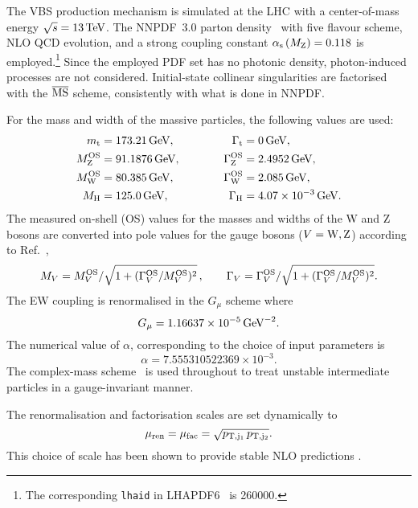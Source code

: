 The VBS production mechanism is simulated at the LHC with a center-of-mass energy $\sqrt s = 13 \,\text{TeV}$. 
The NNPDF~3.0 parton density~\cite{Ball:2014uwa} with five flavour scheme, NLO QCD evolution, and a strong coupling constant $\alpha_\text{s}\left( M_\text{Z} \right) = 0.118$ is employed.\footnote{The corresponding {\tt lhaid} in LHAPDF6~\cite{Buckley:2014ana} is 260000.} 
Since the employed PDF set has no photonic density, photon-induced processes are not considered.
Initial-state collinear singularities are factorised with the ${\overline{\rm MS}}$ scheme, consistently with what is done in NNPDF.

For the mass and width of the massive particles, the following values are used:
%
\begin{alignat}{2}
                  m_\text{t}   &=  173.21\,\text{GeV},       & \quad \quad \quad \Gamma_\text{t} &= 0 \,\text{GeV},  \nonumber \\
                M_\text{Z}^\text{OS} &=  91.1876\,\text{GeV},      & \quad \quad \quad \Gamma_\text{Z}^\text{OS} &= 2.4952\,\text{GeV},  \nonumber \\
                M_\text{W}^\text{OS} &=  80.385\,\text{GeV},       & \Gamma_\text{W}^\text{OS} &= 2.085\,\text{GeV},  \nonumber \\
                M_{\rm H} &=  125.0\,\text{GeV},       &  \Gamma_\text{H}   &=  4.07 \times 10^{-3}\,\text{GeV}.
\end{alignat}
%
The measured on-shell (OS) values for the masses and widths of the W and Z bosons are converted into pole values for the gauge bosons ($V=\text{W},\text{Z}$) according to Ref.~\cite{Bardin:1988xt},
%
\begin{equation}
        M_V = M_{V}^\text{OS}/\sqrt{1+(\Gamma_{V}^\text{OS}/M_{V}^\text{OS})^2}\,,\qquad  \Gamma_V = \Gamma_{V}^\text{OS}/\sqrt{1+(\Gamma_{V}^\text{OS}/M_{V}^\text{OS})^2}.
\end{equation}
%
The EW coupling is renormalised in the $G_\mu$ scheme \cite{Denner:2000bj} where
%
\begin{equation}
    G_{\mu}    = 1.16637\times 10^{-5}\,\text{GeV}^{-2}.
\end{equation}
%
The numerical value of $\alpha$, corresponding to the choice of input parameters is
%
\begin{equation}
 \alpha = 7.555310522369 \times 10^{-3}.
\end{equation}
%
The complex-mass scheme~\cite{Denner:1999gp,Denner:2005fg} is used throughout to treat unstable intermediate particles in a gauge-invariant manner.

The renormalisation and factorisation scales are set dynamically to
%
\begin{equation}
\label{eq:defscale}
 \mu_{\rm ren} = \mu_{\rm fac} = \sqrt{p_{\rm T, j_1}\, p_{\rm T, j_2}}.
\end{equation}
%
This choice of scale has been shown to provide stable NLO predictions \cite{Denner:2012dz}.


